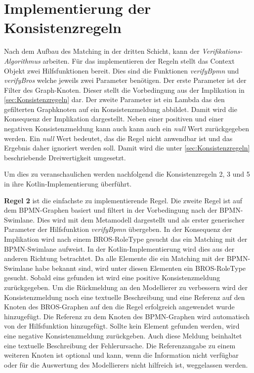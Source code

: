 \section{Implementierung der Konsistenzregeln}

Nach dem Aufbau des Matching in der dritten Schicht, kann der \emph{Verifikations-Algorithmus} arbeiten.
Für das implementieren der Regeln stellt das Context Objekt zwei Hilfsfunktionen bereit.
Dies sind die Funktionen \emph{verifyBpmn} und \emph{verifyBros} welche jeweils zwei Parameter benötigen.
Der erste Parameter ist der Filter des Graph-Knoten.
Dieser stellt die Vorbedingung aus der Implikation in \cref{sec:Konsistenzregeln} dar.
Der zweite Parameter ist ein Lambda das den gefilterten Graphknoten auf ein Konsistenzmeldung abbildet.
Damit wird die Konsequenz der Implikation dargestellt.
Neben einer positiven und einer negativen Konsistenzmeldung kann auch kann auch ein \emph{null} Wert zurückgegeben werden.
Ein \emph{null} Wert bedeutet, das die Regel nicht anwendbar ist und das Ergebnis daher ignoriert werden soll.
Damit wird die unter \cref{sec:Konsistenzregeln} beschriebende Dreiwertigkeit umgesetzt.

Um dies zu veranschaulichen werden nachfolgend die Konsistenzregeln 2, 3 und 5 in ihre Kotlin-Implementierung überführt.

\textbf{Regel 2} ist die einfachste zu implementierende Regel.
Die zweite Regel ist auf dem BPMN-Graphen basiert und filtert in der Vorbedingung nach der BPMN-Swimlane.
Dies wird mit dem Metamodell dargestellt und als erster generischer Parameter der Hilfsfunktion \emph{verifyBpmn} übergeben.
In der Konsequenz der Implikation wird nach einem BROS-RoleType gesucht das ein Matching mit der BPMN-Swimlane aufweist.
In der Kotlin-Implementierung wird dies aus der anderen Richtung betrachtet.
Da alle Elemente die ein Matching mit der BPMN-Swimlane habe bekannt sind, wird unter diesen Elementen ein BROS-RoleType gesucht.
Sobald eins gefunden ist wird eine positive Konsistenzmeldung zurückgegeben.
Um die Rückmeldung an den Modellierer zu verbessern wird der Konsistenzmeldung noch eine textuelle Beschreibung und eine Referenz auf den Knoten des BROS-Graphen auf den die Regel erfolgreich angewendet wurde hinzugefügt.
Die Referenz zu dem Knoten des BPMN-Graphen wird automatisch von der Hilfsfunktion hinzugefügt.
Sollte kein Element gefunden werden, wird eine negative Konsistenzmeldung zurückgeben.
Auch diese Meldung beinhaltet eine textuelle Beschreibung der Fehlerursache.
Die Referenzangabe zu einem weiteren Knoten ist optional und kann, wenn die Information nicht verfügbar oder für die Auswertung des Modellierers nicht hilfreich ist, weggelassen werden.

